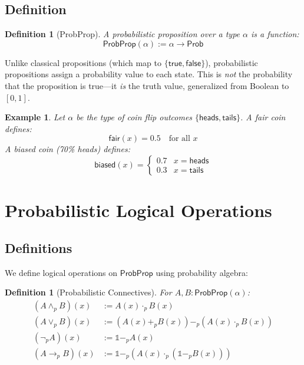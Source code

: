 \documentclass[11pt,a4paper]{article}
\newtheorem{definition}[theorem]{Definition}
\newtheorem{example}[theorem]{Example}
\newcommand{\Prob}{\mathsf{Prob}}
\newcommand{\ProbProp}{\mathsf{ProbProp}}
\newcommand{\pand}{\wedge_p}
\newcommand{\por}{\vee_p}
\newcommand{\pnot}{\neg_p}
\newcommand{\pimplies}{\rightarrow_p}
\newcommand{\pone}{\mathbb{1}}
\newcommand{\padd}{+_p}
\newcommand{\pmul}{\cdot_p}
\newcommand{\psub}{-_p}
\begin{document}
\subsection{Definition}

\begin{definition}[ProbProp]
A \emph{probabilistic proposition} over a type $\alpha$ is a function:
\[
\ProbProp(\alpha) := \alpha \to \Prob
\]
\end{definition}

Unlike classical propositions (which map to $\{\mathsf{true}, \mathsf{false}\}$), probabilistic propositions assign a probability value to each state. This is \emph{not} the probability that the proposition is true---it \emph{is} the truth value, generalized from Boolean to $[0,1]$.

\begin{example}
Let $\alpha$ be the type of coin flip outcomes $\{\mathsf{heads}, \mathsf{tails}\}$. A fair coin defines:
\[
\mathsf{fair}(x) = 0.5 \quad \text{for all } x
\]
A biased coin (70\% heads) defines:
\[
\mathsf{biased}(x) = \begin{cases} 0.7 & x = \mathsf{heads} \\ 0.3 & x = \mathsf{tails} \end{cases}
\]
\end{example}

\section{Probabilistic Logical Operations}

\subsection{Definitions}

We define logical operations on $\ProbProp$ using probability algebra:

\begin{definition}[Probabilistic Connectives]
For $A, B : \ProbProp(\alpha)$:
\begin{align}
    (A \pand B)(x) &:= A(x) \pmul B(x) \label{eq:pand} \\
    (A \por B)(x) &:= (A(x) \padd B(x)) \psub (A(x) \pmul B(x)) \label{eq:por} \\
    (\pnot A)(x) &:= \pone \psub A(x) \label{eq:pnot} \\
    (A \pimplies B)(x) &:= \pone \psub (A(x) \pmul (\pone \psub B(x))) \label{eq:pimplies}
\end{align}
\end{definition}
\end{document}
